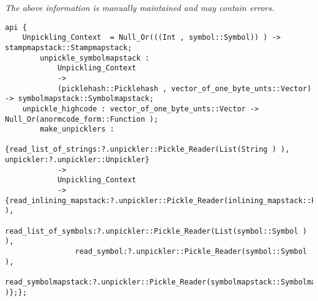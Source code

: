 \label{api:Unpickler\_Junk}

{\tiny \it The above information is manually maintained and may contain errors.}
\begin{verbatim}
api {
    Unpickling_Context  = Null_Or(((Int , symbol::Symbol)) ) -> stampmapstack::Stampmapstack;
        unpickle_symbolmapstack :
            Unpickling_Context
            ->
            (picklehash::Picklehash , vector_of_one_byte_unts::Vector) -> symbolmapstack::Symbolmapstack;
    unpickle_highcode : vector_of_one_byte_unts::Vector -> Null_Or(anormcode_form::Function );
        make_unpicklers :
            {read_list_of_strings:?.unpickler::Pickle_Reader(List(String ) ), unpickler:?.unpickler::Unpickler}
            ->
            Unpickling_Context
            ->  {read_inlining_mapstack:?.unpickler::Pickle_Reader(inlining_mapstack::Picklehash_To_Anormcode_Mapstack ),
                read_list_of_symbols:?.unpickler::Pickle_Reader(List(symbol::Symbol ) ),
                read_symbol:?.unpickler::Pickle_Reader(symbol::Symbol ),
                read_symbolmapstack:?.unpickler::Pickle_Reader(symbolmapstack::Symbolmapstack )};};
\end{verbatim}
